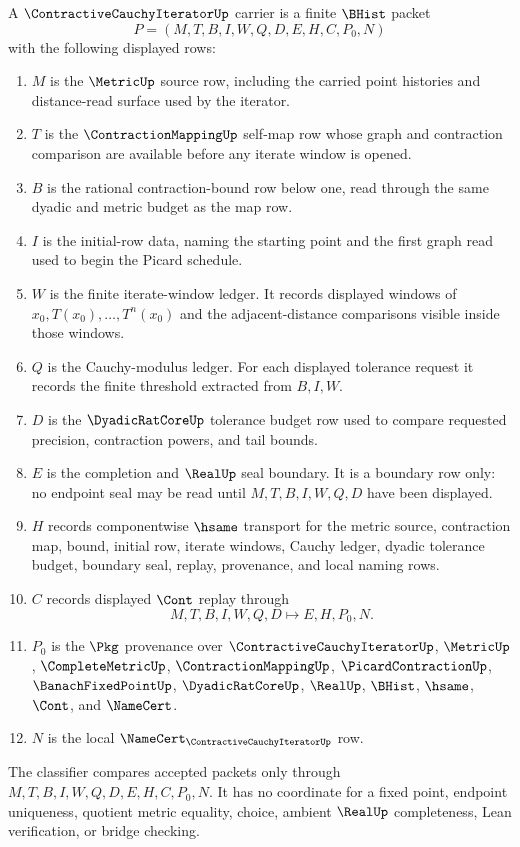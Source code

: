 \begin{definition}
\label{def:contractive-cauchy-iterator-carrier}
A $\ContractiveCauchyIteratorUp$ carrier is a finite $\BHist$ packet
$$
P=(M,T,B,I,W,Q,D,E,H,C,P_0,N)
$$
with the following displayed rows:
\begin{enumerate}
\item $M$ is the $\MetricUp$ source row, including the carried point histories and distance-read surface used by the iterator.
\item $T$ is the $\ContractionMappingUp$ self-map row whose graph and contraction comparison are available before any iterate window is opened.
\item $B$ is the rational contraction-bound row below one, read through the same dyadic and metric budget as the map row.
\item $I$ is the initial-row data, naming the starting point and the first graph read used to begin the Picard schedule.
\item $W$ is the finite iterate-window ledger. It records displayed windows of $x_0,T(x_0),\ldots,T^n(x_0)$ and the adjacent-distance comparisons visible inside those windows.
\item $Q$ is the Cauchy-modulus ledger. For each displayed tolerance request it records the finite threshold extracted from $B,I,W$.
\item $D$ is the $\DyadicRatCoreUp$ tolerance budget row used to compare requested precision, contraction powers, and tail bounds.
\item $E$ is the completion and $\RealUp$ seal boundary. It is a boundary row only: no endpoint seal may be read until $M,T,B,I,W,Q,D$ have been displayed.
\item $H$ records componentwise $\hsame$ transport for the metric source, contraction map, bound, initial row, iterate windows, Cauchy ledger, dyadic tolerance budget, boundary seal, replay, provenance, and local naming rows.
\item $C$ records displayed $\Cont$ replay through
$$
M,T,B,I,W,Q,D \longmapsto E,H,P_0,N .
$$
\item $P_0$ is the $\Pkg$ provenance over $\ContractiveCauchyIteratorUp$, $\MetricUp$, $\CompleteMetricUp$, $\ContractionMappingUp$, $\PicardContractionUp$, $\BanachFixedPointUp$, $\DyadicRatCoreUp$, $\RealUp$, $\BHist$, $\hsame$, $\Cont$, and $\NameCert$.
\item $N$ is the local $\NameCert_{\ContractiveCauchyIteratorUp}$ row.
\end{enumerate}
The classifier compares accepted packets only through $M,T,B,I,W,Q,D,E,H,C,P_0,N$. It has no coordinate for a fixed point, endpoint uniqueness, quotient metric equality, choice, ambient $\RealUp$ completeness, Lean verification, or bridge checking.
\end{definition}

